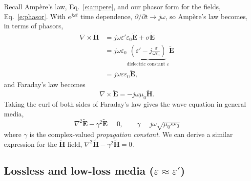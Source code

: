 \documentclass[11pt, oneside]{article}
\begin{document}
Recall Amp\`ere's law, Eq.~\eqref{e:ampere}, and our phasor form for the fields, Eq.~\eqref{e:phasor}. With $e^{j\omega t}$ time dependence, $\partial/\partial t \rightarrow j\omega$, so Amp\`ere's law becomes, in terms of phasors,
\begin{align}
	\nabla\times\tilde{\mathbf{H}} &= j\omega\varepsilon'\varepsilon_0\tilde{\mathbf{E}} + \sigma\tilde{\mathbf{E}} \nonumber\\
	&= j\omega\varepsilon_0\underbrace{\left(\varepsilon' - j\frac{\sigma}{\omega\varepsilon_0}\right)}_{\text{dielectric constant } \varepsilon}\tilde{\mathbf{E}} \nonumber\\
	&= j\omega\varepsilon\varepsilon_0\tilde{\mathbf{E}},
\end{align}
and Faraday's law becomes
\begin{equation}
	\nabla\times\tilde{\mathbf{E}} = -j\omega\mu_0\tilde{\mathbf{H}}.
\end{equation}
Taking the curl of both sides of Faraday's law gives the wave equation in general media,
\begin{equation}
	\label{e:wave_general}
	\boxed{\nabla^2\tilde{\mathbf{E}} - \gamma^2\tilde{\mathbf{E}} = 0,
	\qquad
	\gamma = j\omega\sqrt{\mu_0\varepsilon\varepsilon_0}}
\end{equation}
where $\gamma$ is the complex-valued \emph{propagation constant}. We can derive a similar expression for the $\tilde{\mathbf{H}}$ field, $\nabla^2\tilde{\mathbf{H}} - \gamma^2\tilde{\mathbf{H}} = 0$.

\subsection{Lossless and low-loss media ($\varepsilon \approx \varepsilon'$)}
\end{document}
